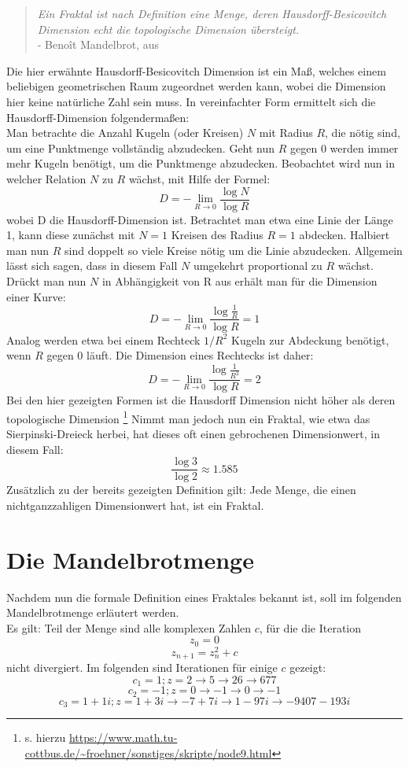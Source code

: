 \documentclass[a4paper,12pt,onesided]{report}
\begin{document}
\begin{quotation}
	\textit{Ein Fraktal ist nach Definition eine Menge, deren  Hausdorff-Besicovitch Dimension echt die topologische Dimension übersteigt.}
	\\ - Benoît Mandelbrot, aus \cite[S. 27]{mandelbrot2013fraktale}
\end{quotation}
Die hier erwähnte Hausdorff-Besicovitch Dimension ist ein Maß, welches einem beliebigen geometrischen Raum zugeordnet werden kann, wobei die Dimension hier keine natürliche Zahl sein muss. In vereinfachter Form ermittelt sich die Hausdorff-Dimension folgendermaßen:\\
Man betrachte die Anzahl Kugeln (oder Kreisen) $N$ mit Radius $R$, die nötig sind, um eine Punktmenge vollständig abzudecken.
Geht nun $R$ gegen 0 werden immer mehr Kugeln benötigt, um die Punktmenge abzudecken. Beobachtet wird nun in welcher Relation $N$ zu $R$ wächst, mit Hilfe der Formel:
\[D = - \lim_{R \to 0} \frac{\log{N}}{\log{R}}\]
wobei D die Hausdorff-Dimension ist. Betrachtet man etwa eine Linie der Länge 1, kann diese zunächst mit $N = 1$ Kreisen des Radius $R = 1$ abdecken. Halbiert man nun $R$ sind doppelt so viele Kreise nötig um die Linie abzudecken. Allgemein lässt sich sagen, dass in diesem Fall $N$ umgekehrt proportional zu $R$ wächst. Drückt man nun $N$ in Abhängigkeit von R aus erhält man für die Dimension einer Kurve:
\[D = - \lim_{R \to 0} \frac{\log{\frac{1}{R}}}{\log{R}} = 1\]
Analog werden etwa bei einem Rechteck $1/R^2$ Kugeln zur Abdeckung benötigt, wenn $R$ gegen 0 läuft. Die Dimension eines Rechtecks ist daher:
\[D = - \lim_{R \to 0} \frac{\log{\frac{1}{R^2}}}{\log{R}} = 2\]
Bei den hier gezeigten Formen ist die Hausdorff Dimension nicht höher als deren topologische Dimension \footnote{s. hierzu \url{https://www.math.tu-cottbus.de/~froehner/sonstiges/skripte/node9.html}} 
Nimmt man jedoch nun ein Fraktal, wie etwa das Sierpinski-Dreieck %
herbei, hat dieses oft einen gebrochenen Dimensionwert, in diesem Fall:
\[\frac{\log{3}}{\log{2}}\approx 1.585\]
Zusätzlich zu der bereits gezeigten Definition gilt:
Jede Menge, die einen nichtganzzahligen Dimensionwert hat, ist ein Fraktal\cite[S. 27]{mandelbrot2013fraktale}.

\section{Die Mandelbrotmenge}
\label{sec:mandelbrotmath}
Nachdem nun die formale Definition eines Fraktales bekannt ist, soll im folgenden Mandelbrotmenge erläutert werden.\\
Es gilt: Teil der Menge sind alle komplexen Zahlen $c$, für die die Iteration
\[z_0=0\]
\[z_{n+1}=z_n^2 + c\]
nicht divergiert.
Im folgenden sind Iterationen für einige $c$ gezeigt:
\[c_1=1 ; z=2 \rightarrow 5 \rightarrow 26 \rightarrow 677\]
\[c_2=-1 ; z=0 \rightarrow -1 \rightarrow 0 \rightarrow -1\]
\[c_3=1+1i ; z=1+3i \rightarrow -7+7i \rightarrow 1-97i \rightarrow -9407-193i\]
\end{document}
